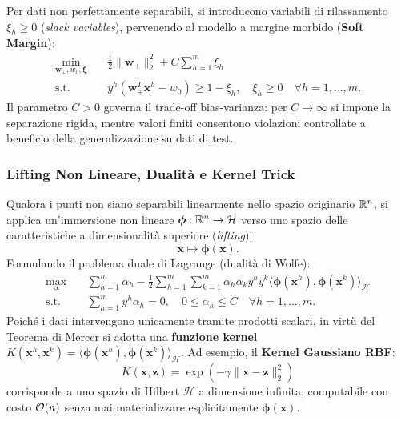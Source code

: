 Per dati non perfettamente separabili, si introducono variabili di rilassamento $\xi_h \ge 0$ (\textit{slack variables}), pervenendo al modello a margine morbido (\textbf{Soft Margin}):
\begin{equation}
\begin{aligned}
    \min_{\mathbf{w}_+, w_0, \boldsymbol{\xi}} \quad & \frac{1}{2} \|\mathbf{w}_+\|_2^2 + C \sum_{h=1}^m \xi_h \\
    \text{s.t.} \quad & y^h (\mathbf{w}_+^T \mathbf{x}^h - w_0) \ge 1 - \xi_h, \quad \xi_h \ge 0 \quad \forall h=1, \dots, m.
\end{aligned}
\end{equation}
Il parametro $C > 0$ governa il trade-off bias-varianza: per $C \to \infty$ si impone la separazione rigida, mentre valori finiti consentono violazioni controllate a beneficio della generalizzazione su dati di test.

\subsubsection{Lifting Non Lineare, Dualit\`a e Kernel Trick}
Qualora i punti non siano separabili linearmente nello spazio originario $\mathbb{R}^n$, si applica un'immersione non lineare $\boldsymbol{\phi}: \mathbb{R}^n \to \mathcal{H}$ verso uno spazio delle caratteristiche a dimensionalit\`a superiore (\textit{lifting}):
\begin{equation}
    \mathbf{x} \mapsto \boldsymbol{\phi}(\mathbf{x}).
\end{equation}
Formulando il problema duale di Lagrange (dualit\`a di Wolfe):
\begin{equation}
\begin{aligned}
    \max_{\boldsymbol{\alpha}} \quad & \sum_{h=1}^m \alpha_h - \frac{1}{2} \sum_{h=1}^m \sum_{k=1}^m \alpha_h \alpha_k y^h y^k \langle \boldsymbol{\phi}(\mathbf{x}^h), \boldsymbol{\phi}(\mathbf{x}^k) \rangle_{\mathcal{H}} \\
    \text{s.t.} \quad & \sum_{h=1}^m y^h \alpha_h = 0, \quad 0 \le \alpha_h \le C \quad \forall h=1, \dots, m.
\end{aligned}
\end{equation}
Poich\'e i dati intervengono unicamente tramite prodotti scalari, in virt\`u del Teorema di Mercer si adotta una \textbf{funzione kernel} $K(\mathbf{x}^h, \mathbf{x}^k) = \langle \boldsymbol{\phi}(\mathbf{x}^h), \boldsymbol{\phi}(\mathbf{x}^k) \rangle_{\mathcal{H}}$. Ad esempio, il \textbf{Kernel Gaussiano RBF}:
\begin{equation}
    K(\mathbf{x}, \mathbf{z}) = \exp\left(-\gamma \|\mathbf{x} - \mathbf{z}\|_2^2\right)
\end{equation}
corrisponde a uno spazio di Hilbert $\mathcal{H}$ a dimensione infinita, computabile con costo $\mathcal{O}\!\left(n\right)$ senza mai materializzare esplicitamente $\boldsymbol{\phi}(\mathbf{x})$.


